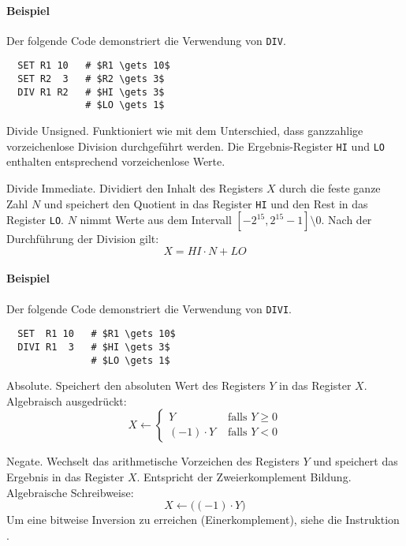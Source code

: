 \paragraph{Beispiel}
Der folgende Code demonstriert die Verwendung von \texttt{DIV}.
\begin{lstlisting}
  SET R1 10   # $R1 \gets 10$
  SET R2  3   # $R2 \gets 3$
  DIV R1 R2   # $HI \gets 3$
              # $LO \gets 1$
\end{lstlisting}




\glqq Divide Unsigned\grqq.
Funktioniert wie  mit dem Unterschied, dass ganzzahlige
vorzeichenlose Division durchgeführt werden. Die Ergebnis-Register \texttt{HI}
und \texttt{LO} enthalten entsprechend vorzeichenlose Werte.




\glqq Divide Immediate\grqq.
Dividiert den Inhalt des Registers $X$ durch die feste ganze Zahl $N$ und
speichert den Quotient in das Register \texttt{HI} und den Rest in das Register
\texttt{LO}.
$N$ nimmt Werte aus dem Intervall $[-2^{15}, 2^{15}-1] \setminus 0$.
Nach der Durchführung der Division gilt:
\[
    X = HI \cdot N + LO 
\]
\paragraph{Beispiel}
Der folgende Code demonstriert die Verwendung von \texttt{DIVI}.
\begin{lstlisting}
  SET  R1 10   # $R1 \gets 10$
  DIVI R1  3   # $HI \gets 3$
               # $LO \gets 1$
\end{lstlisting}




\glqq Absolute\grqq.
Speichert den absoluten Wert des Registers $Y$ in das Register $X$.
Algebraisch ausgedrückt:
\[
    X \gets
    \begin{cases}
      Y            & \text{ falls } Y \geq 0 \\
      (-1) \cdot Y & \text{ falls } Y < 0
    \end{cases}
\]



\glqq Negate\grqq.
Wechselt das arithmetische Vorzeichen des Registers $Y$ und speichert das
Ergebnis in das Register $X$. Entspricht der Zweierkomplement Bildung.
Algebraische Schreibweise:
\[
    X \gets \big( (-1) \cdot Y \big)
\]
Um eine bitweise Inversion zu erreichen (Einerkomplement), siehe die
Instruktion .



